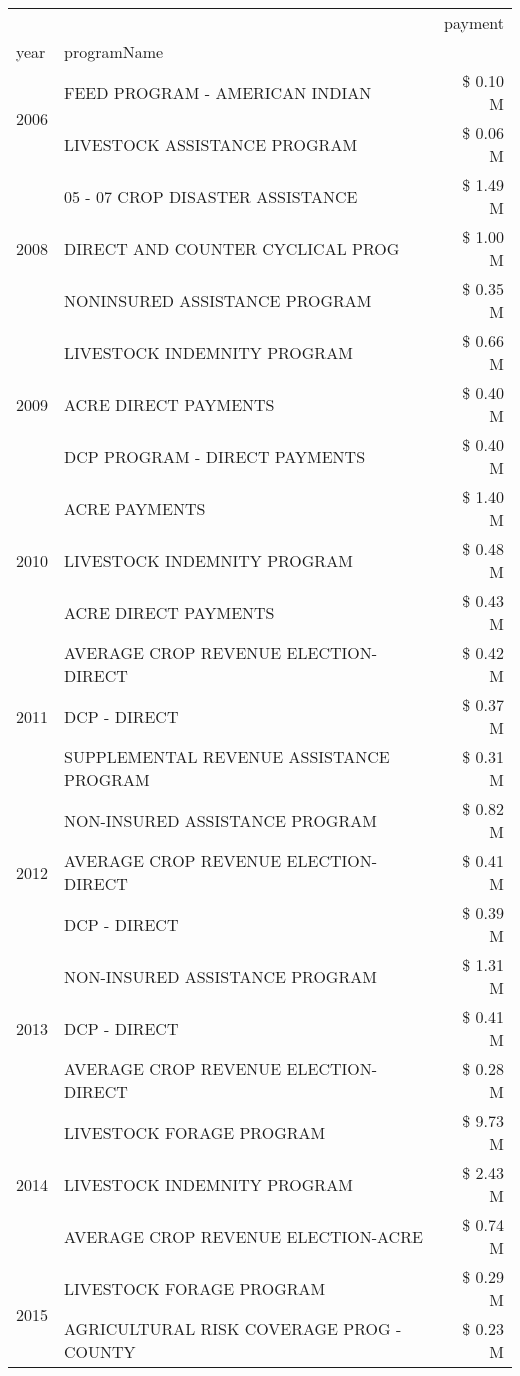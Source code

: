 \begin{tabular}{llr}
\toprule
 &  & payment \\
year & programName &  \\
\midrule
\multirow[t]{2}{*}{2006} & FEED PROGRAM - AMERICAN INDIAN & \$ 0.10 M \\
 & LIVESTOCK ASSISTANCE PROGRAM & \$ 0.06 M \\
\cline{1-3}
\multirow[t]{3}{*}{2008} & 05 - 07 CROP DISASTER ASSISTANCE & \$ 1.49 M \\
 & DIRECT AND COUNTER CYCLICAL PROG & \$ 1.00 M \\
 & NONINSURED ASSISTANCE PROGRAM & \$ 0.35 M \\
\cline{1-3}
\multirow[t]{3}{*}{2009} & LIVESTOCK INDEMNITY PROGRAM & \$ 0.66 M \\
 & ACRE DIRECT PAYMENTS & \$ 0.40 M \\
 & DCP PROGRAM - DIRECT PAYMENTS & \$ 0.40 M \\
\cline{1-3}
\multirow[t]{3}{*}{2010} & ACRE PAYMENTS & \$ 1.40 M \\
 & LIVESTOCK INDEMNITY PROGRAM & \$ 0.48 M \\
 & ACRE DIRECT PAYMENTS & \$ 0.43 M \\
\cline{1-3}
\multirow[t]{3}{*}{2011} & AVERAGE CROP REVENUE ELECTION-DIRECT & \$ 0.42 M \\
 & DCP - DIRECT & \$ 0.37 M \\
 & SUPPLEMENTAL REVENUE ASSISTANCE PROGRAM & \$ 0.31 M \\
\cline{1-3}
\multirow[t]{3}{*}{2012} & NON-INSURED ASSISTANCE PROGRAM & \$ 0.82 M \\
 & AVERAGE CROP REVENUE ELECTION-DIRECT & \$ 0.41 M \\
 & DCP - DIRECT & \$ 0.39 M \\
\cline{1-3}
\multirow[t]{3}{*}{2013} & NON-INSURED ASSISTANCE PROGRAM & \$ 1.31 M \\
 & DCP - DIRECT & \$ 0.41 M \\
 & AVERAGE CROP REVENUE ELECTION-DIRECT & \$ 0.28 M \\
\cline{1-3}
\multirow[t]{3}{*}{2014} & LIVESTOCK FORAGE PROGRAM & \$ 9.73 M \\
 & LIVESTOCK INDEMNITY PROGRAM & \$ 2.43 M \\
 & AVERAGE CROP REVENUE ELECTION-ACRE & \$ 0.74 M \\
\cline{1-3}
\multirow[t]{3}{*}{2015} & LIVESTOCK FORAGE PROGRAM & \$ 0.29 M \\
 & AGRICULTURAL RISK COVERAGE PROG - COUNTY & \$ 0.23 M \\

\end{tabular}
